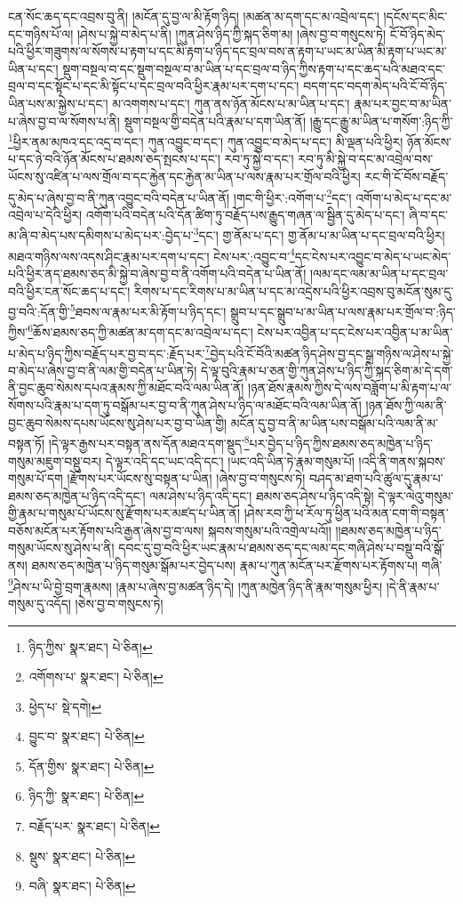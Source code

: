 ངན་སོང་ཆད་དང་འབྲས་བུ་ནི། །མངོན་དུ་བྱ་ལ་མི་རྟོག་ཉིད། །མཚན་མ་དག་དང་མ་འབྲེལ་དང་། །དངོས་དང་མིང་དང་གཉིས་པོ་ལ། །ཤེས་པ་སྐྱེ་བ་མེད་པ་ནི། །ཀུན་ཤེས་ཉིད་ཀྱི་སྐད་ཅིག་མ། །ཞེས་བྱ་བ་གསུངས་ཏེ། ངོ་བོ་ཉིད་མེད་པའི་ཕྱིར་གཟུགས་ལ་སོགས་པ་རྟག་པ་དང་མི་རྟག་པ་ཉིད་དང་བྲལ་བས་ན་རྟག་པ་ཡང་མ་ཡིན་མི་རྟག་པ་ཡང་མ་ཡིན་པ་དང་། སྡུག་བསྔལ་བ་དང་སྡུག་བསྔལ་བ་མ་ཡིན་པ་དང་བྲལ་བ་ཉིད་ཀྱིས་རྟག་པ་དང་ཆད་པའི་མཐའ་དང་བྲལ་བ་དང་སྟོང་པ་དང་མི་སྟོང་པ་དང་བྲལ་བའི་ཕྱིར་རྣམ་པར་དག་པ་དང་། བདག་དང་བདག་མེད་པའི་ངོ་བོ་ཉིད་ཡིན་པས་མ་སྐྱེས་པ་དང་། མ་འགགས་པ་དང་། ཀུན་ནས་ཉོན་མོངས་པ་མ་ཡིན་པ་དང་། རྣམ་པར་བྱང་བ་མ་ཡིན་པ་ཞེས་བྱ་བ་ལ་སོགས་པ་ནི། སྡུག་བསྔལ་གྱི་བདེན་པའི་རྣམ་པ་དག་ཡིན་ནོ། །རྒྱུ་དང་རྒྱུ་མ་ཡིན་པ་གསོག་:ཉིད་ཀྱི་\footnote{ཉིད་ཀྱིས་  སྣར་ཐང་།  པེ་ཅིན། }ཕྱིར་ནམ་མཁའ་དང་འདྲ་བ་དང་། ཀུན་འབྱུང་བ་དང་། ཀུན་འབྱུང་བ་མེད་པ་དང་། མི་ལྡན་པའི་ཕྱིར། ཉོན་མོངས་པ་དང་ཉེ་བའི་ཉོན་མོངས་པ་ཐམས་ཅད་སྤངས་པ་དང་། རབ་ཏུ་སྐྱེ་བ་དང་། རབ་ཏུ་མི་སྐྱེ་བ་དང་མ་འབྲེལ་བས་ཡོངས་སུ་འཛིན་པ་ལས་གྲོལ་བ་དང་རྐྱེན་དང་རྐྱེན་མ་ཡིན་པ་ལས་རྣམ་པར་གྲོལ་བའི་ཕྱིར། རང་གི་ངོ་བོས་བརྗོད་དུ་མེད་པ་ཞེས་བྱ་བ་ནི་ཀུན་འབྱུང་བའི་བདེན་པ་ཡིན་ནོ། །གང་གི་ཕྱིར་:འགོག་པ་\footnote{འགོགས་པ་  སྣར་ཐང་།  པེ་ཅིན། }དང་། འགོག་པ་མེད་པ་དང་མ་འབྲེལ་པ་དེའི་ཕྱིར། འགོག་པའི་བདེན་པའི་དོན་ཚིག་ཏུ་བརྗོད་པས་རྒྱུད་གཞན་ལ་སྦྱིན་དུ་མེད་པ་དང་། ཞི་བ་དང་མ་ཞི་བ་མེད་པས་དམིགས་པ་མེད་པར་:བྱེད་པ་\footnote{ཕྱེད་པ་  སྡེ་དགེ། }དང་། གྱ་ནོམ་པ་དང་། གྱ་ནོམ་པ་མ་ཡིན་པ་དང་བྲལ་བའི་ཕྱིར། མཐའ་གཉིས་ལས་འདས་ཤིང་རྣམ་པར་དག་པ་དང་། ངེས་པར་:འབྱུང་བ་\footnote{བྱུང་བ་  སྣར་ཐང་།  པེ་ཅིན། }དང་ངེས་པར་འབྱུང་བ་མེད་པ་ཡང་མེད་པའི་ཕྱིར་ནད་ཐམས་ཅད་མི་སྐྱེ་བ་ཞེས་བྱ་བ་ནི་འགོག་པའི་བདེན་པ་ཡིན་ནོ། །ལམ་དང་ལམ་མ་ཡིན་པ་དང་བྲལ་བའི་ཕྱིར་ངན་སོང་ཆད་པ་དང་། རིགས་པ་དང་རིགས་པ་མ་ཡིན་པ་དང་མ་འདྲེས་པའི་ཕྱིར་འབྲས་བུ་མངོན་སུམ་དུ་བྱ་བའི་:དོན་གྱི་\footnote{དོན་གྱིས་  སྣར་ཐང་།  པེ་ཅིན། }ཐབས་ལ་རྣམ་པར་མི་རྟོག་པ་ཉིད་དང་། སྒྲུབ་པ་དང་སྒྲུབ་པ་མ་ཡིན་པ་ལས་རྣམ་པར་གྲོལ་བ་:ཉིད་ཀྱིས་\footnote{ཉིད་ཀྱི་  སྣར་ཐང་།  པེ་ཅིན། }ཆོས་ཐམས་ཅད་ཀྱི་མཚན་མ་དག་དང་མ་འབྲེལ་པ་དང་། ངེས་པར་འབྱིན་པ་དང་ངེས་པར་འབྱིན་པ་མ་ཡིན་པ་མེད་པ་ཉིད་ཀྱིས་བརྗོད་པར་བྱ་བ་དང་:རྗོད་པར་\footnote{བརྗོད་པར་  སྣར་ཐང་།  པེ་ཅིན། }བྱེད་པའི་ངོ་བོའི་མཚན་ཉིད་ཤེས་བྱ་དང་སྒྲ་གཉིས་ལ་ཤེས་པ་སྐྱེ་བ་མེད་པ་ཞེས་བྱ་བ་ནི་ལམ་གྱི་བདེན་པ་ཡིན་ཏེ། དེ་ལྟ་བུའི་རྣམ་པ་ཅན་གྱི་ཀུན་ཤེས་པ་ཉིད་ཀྱི་སྐད་ཅིག་མ་དེ་དག་ནི་བྱང་ཆུབ་སེམས་དཔའ་རྣམས་ཀྱི་མཐོང་བའི་ལམ་ཡིན་ནོ། །ཉན་ཐོས་རྣམས་ཀྱིས་དེ་ལས་བཟློག་པ་མི་རྟག་པ་ལ་སོགས་པའི་རྣམ་པ་དག་ཏུ་བསྒོམ་པར་བྱ་བ་ནི་ཀུན་ཤེས་པ་ཉིད་ལ་མཐོང་བའི་ལམ་ཡིན་ནོ། །ཉན་ཐོས་ཀྱི་ལམ་ནི་བྱང་ཆུབ་སེམས་དཔས་ཡོངས་སུ་ཤེས་པར་བྱ་བ་ཡིན་གྱི། མངོན་དུ་བྱ་བ་ནི་མ་ཡིན་པས་བསྒོམ་པའི་ལམ་ནི་མ་བསྟན་ཏོ། །དེ་ལྟར་རྒྱས་པར་བསྟན་ནས་དོན་མཐའ་དག་སྡུད་\footnote{སྡུས་  སྣར་ཐང་།  པེ་ཅིན། }པར་བྱེད་པ་ཉིད་ཀྱིས་ཐམས་ཅད་མཁྱེན་པ་ཉིད་གསུམ་མཇུག་བསྡུ་བར། དེ་ལྟར་འདི་དང་ཡང་འདི་དང་། །ཡང་འདི་ཡིན་ཏེ་རྣམ་གསུམ་པོ། །འདི་ནི་གནས་སྐབས་གསུམ་པོ་དག །རྫོགས་པར་ཡོངས་སུ་བསྟན་པ་ཡིན། །ཞེས་བྱ་བ་གསུངས་ཏེ། བཤད་མ་ཐག་པའི་ཚུལ་དུ་རྣམ་པ་ཐམས་ཅད་མཁྱེན་པ་ཉིད་འདི་དང་། ལམ་ཤེས་པ་ཉིད་འདི་དང་། ཐམས་ཅད་ཤེས་པ་ཉིད་འདི་སྟེ། དེ་ལྟར་ལེའུ་གསུམ་གྱི་རྣམ་པ་གསུམ་པོ་ཡོངས་སུ་རྫོགས་པར་མཛད་པ་ཡིན་ནོ། །ཤེས་རབ་ཀྱི་ཕ་རོལ་ཏུ་ཕྱིན་པའི་མན་ངག་གི་བསྟན་བཅོས་མངོན་པར་རྟོགས་པའི་རྒྱན་ཞེས་བྱ་བ་ལས། སྐབས་གསུམ་པའི་འགྲེལ་པའོ།། །།ཐམས་ཅད་མཁྱེན་པ་ཉིད་གསུམ་ཡོངས་སུ་ཤེས་པ་ནི། དབང་དུ་བྱ་བའི་ཕྱིར་ཡང་རྣམ་པ་ཐམས་ཅད་དང་ལམ་དང་གཞི་ཤེས་པ་བསྡུ་བའི་སྒོ་ནས། ཐམས་ཅད་མཁྱེན་པ་ཉིད་གསུམ་སྒོམ་པར་བྱེད་པས། རྣམ་པ་ཀུན་མངོན་པར་རྫོགས་པར་རྟོགས་པ། གཞི་\footnote{བཞི་  སྣར་ཐང་།  པེ་ཅིན། }ཤེས་པ་ཡི་བྱེ་བྲག་རྣམས། །རྣམ་པ་ཞེས་བྱ་མཚན་ཉིད་དེ། །ཀུན་མཁྱེན་ཉིད་ནི་རྣམ་གསུམ་ཕྱིར། །དེ་ནི་རྣམ་པ་གསུམ་དུ་འདོད། །ཅེས་བྱ་བ་གསུངས་ཏེ། 